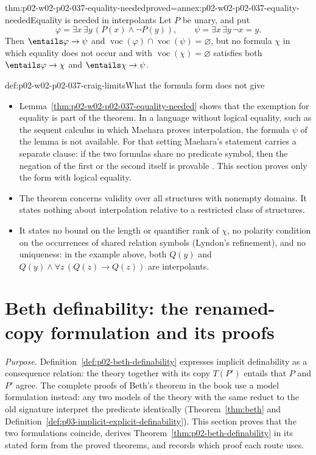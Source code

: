\begin{hblemma}{thm:p02-w02-p02-037-equality-needed}{proved=annex:p02-w02-p02-037-equality-needed}{Equality is needed in interpolants}
Let \(P\) be unary, and put
\[
 \varphi=\exists x\,\exists y\,(P(x)\land\neg P(y)),
 \qquad
 \psi=\exists x\,\exists y\,\neg x=y.
\]
Then \(\entails\varphi\to\psi\) and
\(\operatorname{voc}(\varphi)\cap\operatorname{voc}(\psi)=\varnothing\),
but no formula \(\chi\) in which equality does not occur and with
\(\operatorname{voc}(\chi)=\varnothing\) satisfies both
\(\entails\varphi\to\chi\) and \(\entails\chi\to\psi\).
\end{hblemma}

\begin{hbwarning}{def:p02-w02-p02-037-craig-limits}{What the formula form does not give}
\begin{itemize}
 \item Lemma~\ref{thm:p02-w02-p02-037-equality-needed} shows that the
       exemption for equality is part of the theorem.  In a language
       without logical equality, such as the sequent calculus in which
       Maehara proves interpolation, the formula \(\psi\) of the lemma is
       not available.  For that setting Maehara's statement carries a
       separate clause: if the two formulas share no predicate symbol, then
       the negation of the first or the second itself is provable
       \cite[\S3, p.~236]{Maehara1960}.  This section proves only the
       form with logical equality.
 \item The theorem concerns validity over all structures with nonempty
       domains.  It states nothing about interpolation relative to a
       restricted class of structures.
 \item It states no bound on the length or quantifier rank of \(\chi\), no
       polarity condition on the occurrences of shared relation symbols
       (Lyndon's refinement), and no uniqueness: in the example above, both
       \(Q(y)\) and \(Q(y)\land\forall z\,(Q(z)\to Q(z))\) are interpolants.
\end{itemize}
\end{hbwarning}

\section{Beth definability: the renamed-copy formulation and its proofs}
\label{sec:p02-w02-p02-037-beth}

\emph{Purpose.}  Definition~\ref{def:p02-beth-definability} expresses
implicit definability as a consequence relation: the theory together with
its copy \(T(P')\) entails that \(P\) and \(P'\) agree.  The complete proofs
of Beth's theorem in the book use a model formulation instead: any two
models of the theory with the same reduct to the old signature interpret
the predicate identically (Theorem~\ref{thm:beth} and
Definition~\ref{def:p03-implicit-explicit-definability}).  This section
proves that the two formulations coincide, derives
Theorem~\ref{thm:p02-beth-definability} in its stated form from the proved
theorems, and records which proof each route uses.

